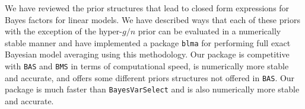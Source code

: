We have reviewed the prior structures that lead to closed form expressions for
Bayes factors for linear models. We have described ways that each of these
priors with the exception of the hyper-$g/n$ prior can be evaluated in a
numerically stable manner and have implemented a package \texttt{blma} for
performing full exact Bayesian model averaging using this methodology. Our
package is competitive with \texttt{BAS} and \texttt{BMS} in terms of
computational speed, is numerically more stable and accurate, and offers some
different priors structures not offered in \texttt{BAS}. Our package is much
faster than \texttt{BayesVarSelect} and is also numerically more stable and
accurate.


